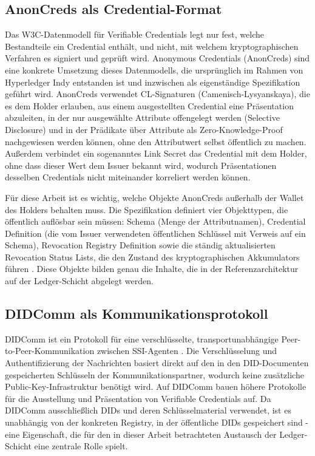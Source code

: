 \subsection{AnonCreds als Credential-Format}
\label{subsec:grundlagen-anoncreds}
Das W3C-Datenmodell für Verifiable Credentials legt nur fest, welche Bestandteile ein Credential enthält, und nicht, mit welchem kryptographischen Verfahren es signiert und geprüft wird. Anonymous Credentials (AnonCreds) sind eine konkrete Umsetzung dieses Datenmodells, die ursprünglich im Rahmen von Hyperledger Indy entstanden ist und inzwischen als eigenständige Spezifikation geführt wird. AnonCreds verwendet CL-Signaturen (Camenisch-Lysyanskaya), die es dem Holder erlauben, aus einem ausgestellten Credential eine Präsentation abzuleiten, in der nur ausgewählte Attribute offengelegt werden (Selective Disclosure) und in der Prädikate über Attribute als Zero-Knowledge-Proof nachgewiesen werden können, ohne den Attributwert selbst öffentlich zu machen. Außerdem verbindet ein sogenanntes Link Secret das Credential mit dem Holder, ohne dass dieser Wert dem Issuer bekannt wird, wodurch Präsentationen desselben Credentials nicht miteinander korreliert werden können. \cite{anoncredsspec}

Für diese Arbeit ist es wichtig, welche Objekte AnonCreds außerhalb der Wallet des Holders behalten muss. Die Spezifikation definiert vier Objekttypen, die öffentlich auflösbar sein müssen: Schema (Menge der Attributnamen), Credential Definition (die vom Issuer verwendeten öffentlichen Schlüssel mit Verweis auf ein Schema), Revocation Registry Definition sowie die ständig aktualisierten Revocation Status Lists, die den Zustand des kryptographischen Akkumulators führen \cite{anoncredsspec}. Diese Objekte bilden genau die Inhalte, die in der Referenzarchitektur auf der Ledger-Schicht abgelegt werden.

\subsection{DIDComm als Kommunikationsprotokoll}
DIDComm ist ein Protokoll für eine verschlüsselte, transportunabhängige Peer-to-Peer-Kommunikation zwischen SSI-Agenten \cite{mazzocca2025}. Die Verschlüsselung und Authentifizierung der Nachrichten basiert direkt auf den in den DID-Documenten gespeicherten Schlüsseln der Kommunikationspartner, wodurch keine zusätzliche Public-Key-Infrastruktur benötigt wird. Auf DIDComm bauen höhere Protokolle für die Ausstellung und Präsentation von Verifiable Credentials auf. Da DIDComm ausschließlich DIDs und deren Schlüsselmaterial verwendet, ist es unabhängig von der konkreten Registry, in der öffentliche DIDs gespeichert sind  - eine Eigenschaft, die für den in dieser Arbeit betrachteten Austausch der Ledger-Schicht eine zentrale Rolle spielt.

